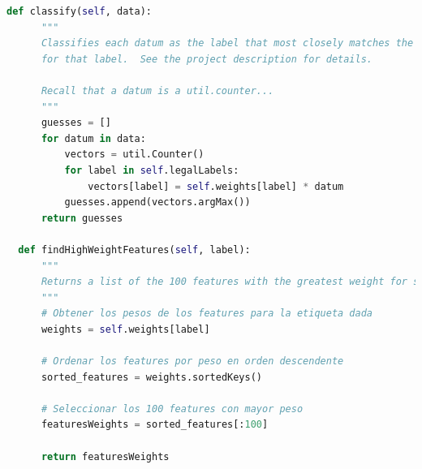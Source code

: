 \documentclass{report}
\begin{document}
\begin{lstlisting}[language=Python, caption=Implementación inicial del perceptron]
  def classify(self, data):
      """
      Classifies each datum as the label that most closely matches the prototype vector
      for that label.  See the project description for details.

      Recall that a datum is a util.counter...
      """
      guesses = []
      for datum in data:
          vectors = util.Counter()
          for label in self.legalLabels:
              vectors[label] = self.weights[label] * datum
          guesses.append(vectors.argMax())
      return guesses

  def findHighWeightFeatures(self, label):
      """
      Returns a list of the 100 features with the greatest weight for some label
      """
      # Obtener los pesos de los features para la etiqueta dada
      weights = self.weights[label]

      # Ordenar los features por peso en orden descendente
      sorted_features = weights.sortedKeys()

      # Seleccionar los 100 features con mayor peso
      featuresWeights = sorted_features[:100]

      return featuresWeights
        \end{lstlisting}
\end{document}
